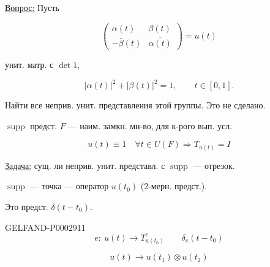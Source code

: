 \underline{\underline{Вопрос:}} Пусть

\begin{equation*}
\begin{pmatrix}\alpha(t)&\beta(t)\\-\bar\beta(t)&\overline{\alpha(t)}\end{pmatrix}=u(t)
\end{equation*}

унит. матр. с $\det1$,

\begin{equation*}|\alpha(t)|^2+|\beta(t)|^2=1,\qquad t\in[0,1].\end{equation*}

Найти все неприв. унит. представления этой группы. Это не сделано.

$\operatorname{supp}$ предст. $F$ --- наим. замкн. мн-во, для к-рого вып. усл.

\begin{equation*}u(t)\equiv1\quad\forall t\in U(F)\Longrightarrow T_{u(t)}=I\end{equation*}

\underline{Задача:} сущ. ли неприв. унит. представл. с $\operatorname{supp}$ --- отрезок.

\begin{center}\end{center}

$\operatorname{supp}$ --- точка --- оператор $u(t_0)$ (2-мерн. предст.).

Это предст. $\delta(t-t_0)$.

\begin{GelfandAdjacentEvidence}{GELFAND-P000291}{1}
\begin{equation*}e:\ u(t)\longrightarrow T^e_{u(t_0)}\qquad\delta_e(t-t_0)\end{equation*}

\end{GelfandAdjacentEvidence}


\begin{equation*}u(t)\longrightarrow u(t_1)\otimes u(t_2)\end{equation*}

